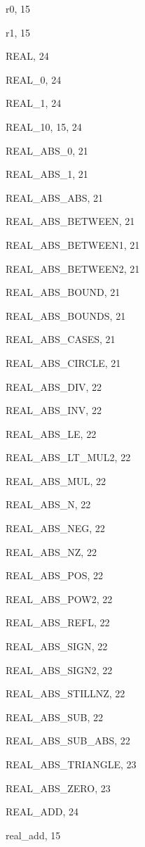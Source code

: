 \begin{theindex}
  \item {\ptt r0}, 15
  \item {\ptt r1}, 15
  \item {\ptt REAL}, 24
  \item {\ptt REAL\_0}, 24
  \item {\ptt REAL\_1}, 24
  \item {\ptt REAL\_10}, 15, 24
  \item {\ptt REAL\_ABS\_0}, 21
  \item {\ptt REAL\_ABS\_1}, 21
  \item {\ptt REAL\_ABS\_ABS}, 21
  \item {\ptt REAL\_ABS\_BETWEEN}, 21
  \item {\ptt REAL\_ABS\_BETWEEN1}, 21
  \item {\ptt REAL\_ABS\_BETWEEN2}, 21
  \item {\ptt REAL\_ABS\_BOUND}, 21
  \item {\ptt REAL\_ABS\_BOUNDS}, 21
  \item {\ptt REAL\_ABS\_CASES}, 21
  \item {\ptt REAL\_ABS\_CIRCLE}, 21
  \item {\ptt REAL\_ABS\_DIV}, 22
  \item {\ptt REAL\_ABS\_INV}, 22
  \item {\ptt REAL\_ABS\_LE}, 22
  \item {\ptt REAL\_ABS\_LT\_MUL2}, 22
  \item {\ptt REAL\_ABS\_MUL}, 22
  \item {\ptt REAL\_ABS\_N}, 22
  \item {\ptt REAL\_ABS\_NEG}, 22
  \item {\ptt REAL\_ABS\_NZ}, 22
  \item {\ptt REAL\_ABS\_POS}, 22
  \item {\ptt REAL\_ABS\_POW2}, 22
  \item {\ptt REAL\_ABS\_REFL}, 22
  \item {\ptt REAL\_ABS\_SIGN}, 22
  \item {\ptt REAL\_ABS\_SIGN2}, 22
  \item {\ptt REAL\_ABS\_STILLNZ}, 22
  \item {\ptt REAL\_ABS\_SUB}, 22
  \item {\ptt REAL\_ABS\_SUB\_ABS}, 22
  \item {\ptt REAL\_ABS\_TRIANGLE}, 23
  \item {\ptt REAL\_ABS\_ZERO}, 23
  \item {\ptt REAL\_ADD}, 24
  \item {\ptt real\_add}, 15

\end{theindex}
